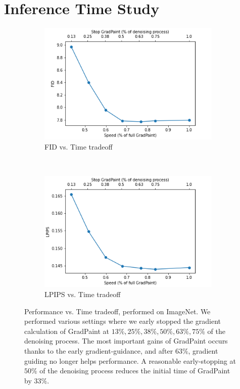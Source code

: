 \section{Inference Time Study}\label{speed_section}

\begin{figure}[t!]
    \centering
    \begin{subfigure}[t]{0.5\linewidth}
        \centering
        \includegraphics[height=2.3in]{images/gradpaint/speed_fid.png}
        \caption{FID vs. Time tradeoff}
    \end{subfigure}%
    ~ 
    \begin{subfigure}[t]{0.5\linewidth}
        \centering
        \includegraphics[height=2.3in]{images/gradpaint/speed_lpips.png}
        \caption{LPIPS vs. Time tradeoff}
    \end{subfigure}
    \caption{Performance vs. Time tradeoff, performed on ImageNet. We performed various settings where we early stopped the gradient calculation of GradPaint at $13\%, 25\%, 38\%, 50\%, 63\%, 75\%$ of the denoising process. The most important gains of GradPaint occurs thanks to the early gradient-guidance, and after $63\%$, gradient guiding no longer helps performance. A reasonable early-stopping at $50\%$ of the denoising process reduces the initial time of GradPaint by $33\%$.}
    \label{timsvsacc}
\end{figure}

